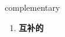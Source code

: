 
\begin{frame}
{\huge complementary}
\begin{center}
\begin{enumerate}\Large
  \item \textbf{互补的}
\end{enumerate}
\end{center}
\end{frame}
